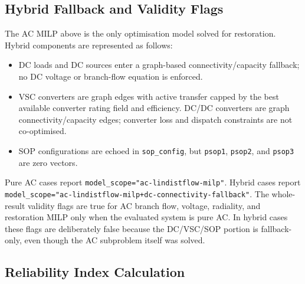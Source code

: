 \subsection{Hybrid Fallback and Validity Flags}
\label{sec:3stage-hybrid-scope}

The AC MILP above is the only optimisation model solved for restoration.
Hybrid components are represented as follows:

\begin{itemize}
  \item DC loads and DC sources enter a graph-based connectivity/capacity
        fallback; no DC voltage or branch-flow equation is enforced.
  \item VSC converters are graph edges with active transfer capped by the best
    available converter rating field and efficiency.  DC/DC converters are
    graph connectivity/capacity edges; converter loss and dispatch
    constraints are not co-optimised.
  \item SOP configurations are echoed in \texttt{sop\_config}, but
        \texttt{psop1}, \texttt{psop2}, and \texttt{psop3} are zero vectors.
\end{itemize}

Pure AC cases report \texttt{model\_scope="ac-lindistflow-milp"}.  Hybrid
cases report
\texttt{model\_scope="ac-lindistflow-milp+dc-connectivity-fallback"}.  The
whole-result validity flags are true for AC branch flow, voltage, radiality,
and restoration MILP only when the evaluated system is pure AC.  In hybrid
cases these flags are deliberately false because the DC/VSC/SOP portion is
fallback-only, even though the AC subproblem itself was solved.

\subsection{Reliability Index Calculation}
\label{sec:3stage-indices}

